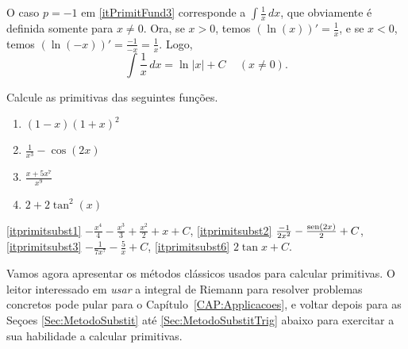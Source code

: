 O caso $p=-1$ em \eqref{itPrimitFund3} corresponde a $\int \frac1x\,dx$, que
obviamente é definida somente para $x\neq 0$. Ora, se $x>0$, temos $(\ln
(x))'=\tfrac1x$, e se $x<0$, temos $(\ln (-x))'=\tfrac{-1}{-x}=\tfrac1x$. Logo,
$$\boxed{\int \frac1x \,dx=\ln|x|+C\,\quad (x\neq 0).}$$

\begin{exo}
Calcule as primitivas das seguintes funções.
\begin{multicols}{3}
\begin{enumerate}
\item\label{itprimitsubst1} $(1-x)(1+x)^2$
\item\label{itprimitsubst2} $\frac{1}{x^3}-\cos(2x)$
\item\label{itprimitsubst3} $\frac{x+5x^7}{x^9}$
\item\label{itprimitsubst6} $2+2\tan^2(x)$
\end{enumerate}
\end{multicols}
\vspace{0.01cm}
\begin{sol}
\eqref{itprimitsubst1}
$-\frac{x^4}{4}-\frac{x^3}{3}+\frac{x^2}{2}+x+C$, 
\eqref{itprimitsubst2} $\frac{-1}{2x^2}-\frac{\operatorname{sen} (2x)}{2}+C$,
\eqref{itprimitsubst3} $-\frac{1}{7x^7}-\frac{5}{x}+C$, 
\eqref{itprimitsubst6} $2\tan x+C$.
\end{sol}
\end{exo}

Vamos agora apresentar os métodos clássicos usados para 
calcular primitivas.
O leitor interessado em \emph{usar} a integral de Riemann para
resolver problemas concretos pode pular para o
Capítulo~\ref{CAP:Applicacoes}, e voltar depois para as Seçoes 
\ref{Sec:MetodoSubstit} até \ref{Sec:MetodoSubstitTrig} abaixo para
exercitar a sua habilidade a calcular primitivas.

